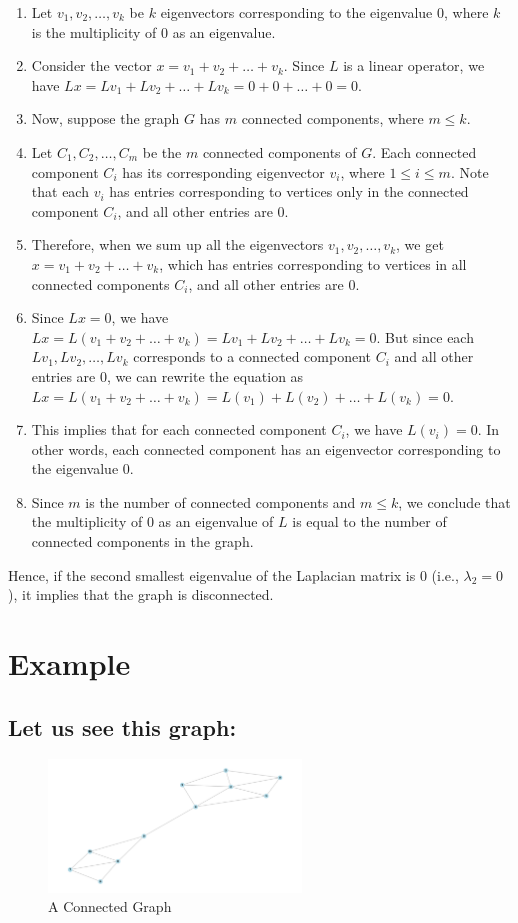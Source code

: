 \documentclass{article}
\begin{document}
\begin{enumerate}
  \item Let $v_1, v_2, \ldots, v_k$ be $k$ eigenvectors corresponding to the eigenvalue $0$, where $k$ is the multiplicity of $0$ as an eigenvalue.
  \item Consider the vector $x = v_1 + v_2 + \ldots + v_k$. Since $L$ is a linear operator, we have $Lx = Lv_1 + Lv_2 + \ldots + Lv_k = 0 + 0 + \ldots + 0 = 0$.
  \item Now, suppose the graph $G$ has $m$ connected components, where $m \leq k$.
  \item Let $C_1, C_2, \ldots, C_m$ be the $m$ connected components of $G$. Each connected component $C_i$ has its corresponding eigenvector $v_i$, where $1 \leq i \leq m$. Note that each $v_i$ has entries corresponding to vertices only in the connected component $C_i$, and all other entries are $0$.
  \item Therefore, when we sum up all the eigenvectors $v_1, v_2, \ldots, v_k$, we get $x = v_1 + v_2 + \ldots + v_k$, which has entries corresponding to vertices in all connected components $C_i$, and all other entries are $0$.
  \item Since $Lx = 0$, we have $Lx = L(v_1 + v_2 + \ldots + v_k) = Lv_1 + Lv_2 + \ldots + Lv_k = 0$. But since each $Lv_1, Lv_2, \ldots, Lv_k$ corresponds to a connected component $C_i$ and all other entries are $0$, we can rewrite the equation as $Lx = L(v_1 + v_2 + \ldots + v_k) = L(v_1) + L(v_2) + \ldots + L(v_k) = 0$.
  \item This implies that for each connected component $C_i$, we have $L(v_i) = 0$. In other words, each connected component has an eigenvector corresponding to the eigenvalue $0$.
  \item Since $m$ is the number of connected components and $m \leq k$, we conclude that the multiplicity of $0$ as an eigenvalue of $L$ is equal to the number of connected components in the graph.
\end{enumerate}

Hence, if the second smallest eigenvalue of the Laplacian matrix is $0$ (i.e., $\lambda_2 = 0$), it implies that the graph is disconnected.
\section*{Example}
\subsection*{Let us see this graph:}
\begin{figure}[h]
    \centering
    \includegraphics[width=0.6\textwidth]{congraph.png}
    \caption{A Connected Graph}
    \label{fig:ConnectedGraph}
\end{figure}
\end{document}
